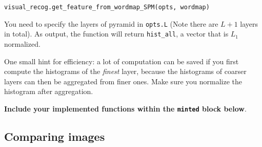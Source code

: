 \documentclass[11pt]{article}
\makeatletter
\numberwithin{equation}{section} %
\numberwithin{figure}{section} %
\numberwithin{table}{section} %
\DeclareRobustCommand\onedot{\futurelet\@let@token\@onedot}
\def\@onedot{\ifx\@let@token.\else.\null\fi\xspace}
\def\ie{\emph{i.e}\onedot} \def\Ie{\emph{I.e}\onedot}
\makeatother
\begin{document}
\begin{center}
{\tt visual\_recog.get\_feature\_from\_wordmap\_SPM(opts, wordmap)}
\end{center}
You need to specify the layers of pyramid in {\tt opts.L} (Note there are $L+1$ layers in total). 
As output, the function will return {\tt hist\_all}, a vector that is $L_1$ normalized. 

One small hint for efficiency: a lot of computation can be saved if you first compute the histograms of the {\it finest} layer, because the histograms of coarser layers can then be aggregated from finer ones. Make sure you normalize the histogram after aggregation.

\textbf{Include your implemented functions  within the \texttt{minted} block below}.



\subsection{Comparing images}
\end{document}
